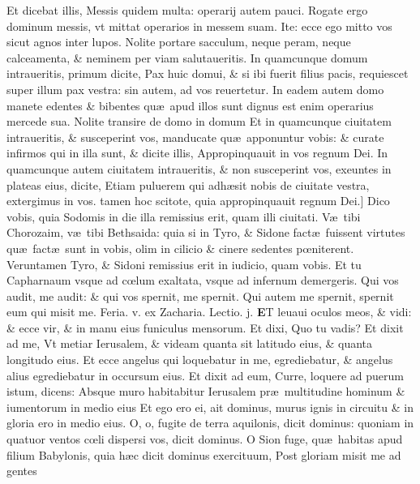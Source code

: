\documentclass[a5paper,10pt]{book}
\def\rightmarginnote{%
	\lrmarginnote{\hskip\columnwidth \hskip -1em}}
\def\ae{æ}
\def\oe{œ}
\begin{document}
\begin{multicols*}{2}
Et dicebat illis, Messis quidem multa: operarij
autem pauci.
Rogate ergo dominum messis, vt mittat operarios in messem suam.
Ite: ecce ego mitto vos sicut agnos inter lupos. Nolite portare sacculum, neque peram, neque calceamenta, \& neminem per viam salutaueritis.
In quamcunque domum intraueritis, primum dicite, Pax huic domui, \& si ibi fuerit filius pacis, requiescet super illum pax vestra: sin autem, ad vos reuertetur.
In eadem autem domo manete edentes \& bibentes qu\ae \ apud illos sunt dignus est enim operarius mercede sua.
Nolite transire de domo in domum Et in quamcunque ciuitatem intraueritis, \& susceperint vos, manducate qu\ae \ apponuntur vobis: \& curate infirmos qui in illa sunt, \& dicite illis, Appropinquauit in vos regnum Dei.
In quamcunque autem ciuitatem intraueritis, \& non susceperint vos, exeuntes in plateas eius, dicite, Etiam puluerem qui adh\ae sit nobis de ciuitate vestra, extergimus in vos. tamen hoc scitote, quia appropinquauit regnum Dei.]
Dico\rightmarginnote{B} vobis, quia Sodomis in die illa remissius erit, quam illi ciuitati.
V\ae \ tibi Chorozaim, v\ae \ tibi Bethsaida: quia si in Tyro, \& Sidone fact\ae \ fuissent virtutes qu\ae \ fact\ae \ sunt in vobis, olim in cilicio \& cinere sedentes p\oe niterent.
Veruntamen Tyro, \& Sidoni remissius erit in iudicio, quam vobis. Et tu Capharnaum vsque ad c\oe lum exaltata, vsque ad infernum demergeris.
Qui vos audit, me audit: \& qui vos spernit, me spernit. Qui autem me spernit, spernit eum qui misit me.
\newline {} \color{red} \hypertarget{THU-QVARTA-ADV}{Feria. v.} ex Zacharia. \hfill Lectio. j. \color{black}%
\vspace{-.25em}
\lettrine[lines=2]{\bfseries E}{}T\rightmarginnote{ca. 2.} leuaui oculos meos, \& vidi: \& ecce vir, \& in manu eius funiculus mensorum.
Et dixi, Quo tu vadis? Et dixit ad me, Vt metiar Ierusalem, \& videam quanta sit latitudo eius, \& quanta longitudo eius.
Et ecce angelus qui loquebatur in me, egrediebatur, \& angelus alius egrediebatur in occursum eius.
Et dixit ad eum, Curre, loquere ad puerum istum, dicens: Absque muro habitabitur Ierusalem pr\ae \ multitudine hominum \& iumentorum in medio eius Et ego ero ei, ait dominus, murus ignis in circuitu \& in gloria ero in medio eius.
O, o, fugite de terra aquilonis, dicit dominus: quoniam in quatuor ventos c\oe li dispersi vos, dicit dominus.
O Sion fuge, qu\ae \ habitas apud filium Babylonis, quia h\ae c dicit dominus exercituum, Post gloriam misit me ad gentes

\end{multicols*}
\end{document}
